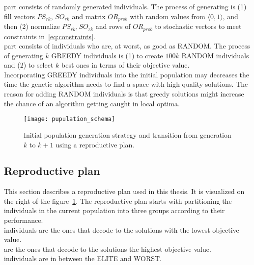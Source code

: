  part consists of randomly generated individuals.
The process of generating is (1) fill vectors $PS_{rk}$, $SO_{rk}$ and matrix $OR_{prob}$ with random values from $\langle 0,1 \rangle$,
and then (2) normalize $PS_{rk}, SO_{rk}$ and rows of $OR_{prob}$  to stochastic vectors to meet constraints in~\ref{eq:constraints}.\\

 part consists of individuals who are, at worst, as good as RANDOM.
The process of generating $k$ GREEDY individuals is (1) to create $100k$ RANDOM individuals and (2) to select $k$ best ones
in terms of their objective value.\\

Incorporating GREEDY individuals into the initial population may decreases the time the genetic algorithm needs to find a space with high-quality solutions.
The reason for adding RANDOM individuals is that greedy solutions might increase the chance
of an algorithm getting caught in local optima.

\begin{figure}[!h]
    \texttt{[image: pupulation\_schema]}
    \caption[Initial population generation strategy and transition]
    {Initial population generation strategy and transition from generation $k$ to $k+1$ using a reproductive plan.}
    \label{fig:population-schema}
\end{figure}


\newpage

\subsection{Reproductive plan}\label{subsec:reproductive-plan}
This section describes a reproductive plan used in this thesis.
It is visualized on the right of the figure~\ref{fig:population-schema}.
The reproductive plan starts with partitioning the individuals in the current
population into three groups according to their performance.\\

 individuals are the ones that decode to the solutions with the lowest objective value.\\

 are the ones that decode to the solutions the highest objective value.\\

 individuals are in between the ELITE and WORST.\\


